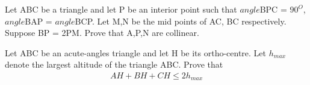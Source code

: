 \item Let ABC be a triangle and let P be an interior point such that $angle$BPC = $90^{O}$, $angle$BAP =  $angle$BCP. Let M,N be the mid points of AC, BC respectively. Suppose BP = 2PM. Prove that A,P,N are collinear.

\item Let ABC be an acute-angles triangle and let H be its ortho-centre. Let $h_{max}$ denote the largest altitude of the triangle ABC. Prove that
\begin{align*}
AH + BH + CH \leq 2h_{max}
\end{align*}





















